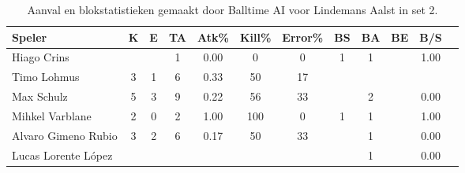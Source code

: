 \begin{table}[ht!]
  \centering
  \scriptsize
  \begin{tabular}{|l|c|c|c|c|c|c|c|c|c|c|c|} \hline
    \textbf{Speler} & K & E & TA & Atk\% & Kill\%  & Error\% & BS & BA & BE & B/S \\ \hline
    Hiago Crins & & & 1 & 0.00 & 0  & 0 & 1 & 1 & & 1.00 \\
    Timo Lohmus & 3 & 1 & 6 & 0.33 & 50  & 17 &  &  & & \\
    Max Schulz & 5 & 3 & 9 & 0.22 & 56  & 33 &  & 2 & & 0.00 \\
    Mihkel Varblane & 2 & 0 & 2 & 1.00 & 100  & 0 & 1 & 1 & & 1.00 \\
    Alvaro Gimeno Rubio & 3 & 2 & 6 & 0.17 & 50  & 33 &  & 1 & & 0.00\\
    Lucas Lorente López &  &  &  &  &  &  &  & 1 & & 0.00 \\ \hline
  \end{tabular}
  \caption[Aanvals- en blokstatistieken gemaakt door Balltime AI voor Lindemans Aalst in set 2]{\label{tab:PL1AttBlockAalstAI2}Aanval en blokstatistieken gemaakt door Balltime AI voor Lindemans Aalst in set 2.}
\end{table}
